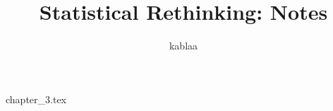 \documentclass{article}
\title{Statistical Rethinking: Notes}
\author{kablaa}
\begin{document}
\maketitle
{chapter_3.tex}
\end{document}
